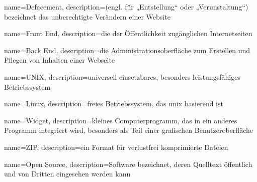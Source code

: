 \usepackage{xparse}
 {
  \makeglossaries
}


{
  name=Defacement,
  description={(engl. für „Entstellung“ oder „Verunstaltung“) bezeichnet das unberechtigte Verändern einer Website}
}

{
	name=Front End,
    description={die der Öffentlichkeit zugänglichen Internetseiten}
}

{
	name=Back End,
    description={die Administrationsoberfläche zum Erstellen und Pflegen von Inhalten einer Webseite}
}

{
	name=UNIX,
    description={universell einsetzbares, besonders leistungsfähiges Betriebssystem}
}

{
	name=Linux,
    description={freies Betriebssystem, das \gls{unix} basierend ist}
}

{
	name=Widget,
    description={kleines Computerprogramm, das in ein anderes Programm integriert wird, besonders als Teil einer grafischen Benutzeroberfläche}
}

{
	name=ZIP,
    description={ein Format für verlustfrei komprimierte Dateien}
}

{
	name={Open Source},
    description={Software bezeichnet, deren Quelltext öffentlich und von Dritten eingesehen werden kann}
}

